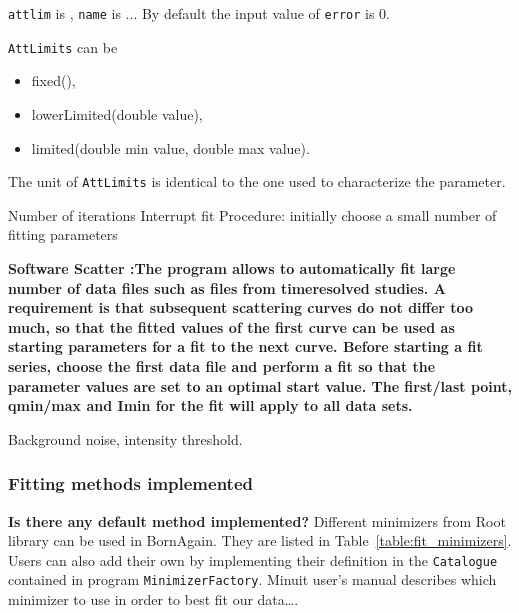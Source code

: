 \texttt{attlim} is , \texttt{name} is ...
By default the input value of \texttt{error} is 0.
 

\texttt{AttLimits} can be
\begin{itemize}
\item fixed(), 
\item lowerLimited(double value), 
\item limited(double min value, double max value).
\end{itemize}
The unit of \texttt{AttLimits} is  identical to the one used to characterize the
parameter.

Number of iterations
Interrupt fit
Procedure: initially choose a small number of fitting parameters

\textbf{ Software Scatter :The program allows to automatically fit large number of data files such as files from timeresolved
studies. A requirement is that subsequent scattering curves do not differ too much, so
that the fitted values of the first curve can be used as starting parameters for a fit to the next
curve. Before starting a fit series, choose the first data file and perform a fit so that the
parameter values are set to an optimal start value. The first/last point, qmin/max and Imin for
the fit will apply to all data sets.}

Background noise, intensity threshold.


\subsubsection{Fitting methods implemented}

\textbf{Is there any default method implemented?}
Different minimizers from Root library can be used in BornAgain. They are listed in
Table~\ref{table:fit_minimizers}. Users can also add their own by
implementing their definition in the \texttt{Catalogue} contained in
program \texttt{MinimizerFactory}.
Minuit user's manual describes which minimizer to use in order to best
fit our data\ldots  \cite{MinuitRoot}.

